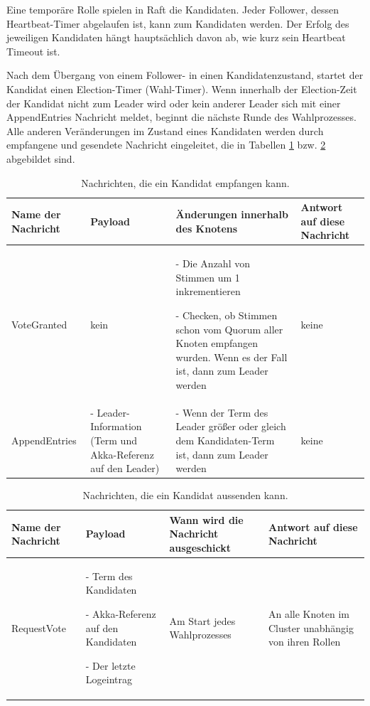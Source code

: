 Eine temporäre Rolle spielen in Raft die Kandidaten. Jeder Follower, dessen Heartbeat-Timer abgelaufen ist, kann zum Kandidaten werden. Der Erfolg des jeweiligen Kandidaten hängt hauptsächlich davon ab, wie kurz sein Heartbeat Timeout ist.

Nach dem Übergang von einem Follower- in einen Kandidatenzustand, startet der Kandidat einen Election-Timer (Wahl-Timer). Wenn innerhalb der Election-Zeit der Kandidat nicht zum Leader wird oder kein anderer Leader sich mit einer AppendEntries Nachricht meldet, beginnt die nächste Runde des Wahlprozesses. Alle anderen Veränderungen im Zustand eines Kandidaten werden durch empfangene und gesendete Nachricht eingeleitet, die in Tabellen \ref{tab:candidateReceive} bzw. \ref{tab:candidateSend} abgebildet sind.

\begin{table} \centering
	\begin{tabular}{|p{2.5cm}|p{3.5cm}|p{3.5cm}|p{3.5cm}|} 
		\hline
		\textbf{Name der Nachricht} & \textbf{Payload} & \textbf{Änderungen innerhalb des Knotens} & \textbf{Antwort auf diese Nachricht}\\
		
		\hline
		VoteGranted & kein & - Die Anzahl von Stimmen um 1 inkrementieren
		
		- Checken, ob Stimmen schon vom Quorum aller Knoten empfangen wurden. Wenn es der Fall ist, dann zum Leader werden
		 & keine\\
		
		\hline
		AppendEntries & - Leader-Information (Term und Akka-Referenz auf den Leader) 
		& - Wenn der Term des Leader größer oder gleich dem Kandidaten-Term ist, dann zum Leader werden & keine\\
		
		\hline
	\end{tabular}
	\caption{Nachrichten, die ein Kandidat empfangen kann.}
	\label{tab:candidateReceive}
\end{table}

\begin{table} \centering
	\begin{tabular}{|p{2.5cm}|p{3.5cm}|p{3.5cm}|p{3.5cm}|} 
		\hline
		\textbf{Name der Nachricht} & \textbf{Payload} & \textbf{Wann wird die Nachricht ausgeschickt} & \textbf{Antwort auf diese Nachricht}\\
		
		\hline
		RequestVote & - Term des Kandidaten
		
		- Akka-Referenz auf den Kandidaten
		
		- Der letzte Logeintrag
		 & Am Start jedes Wahlprozesses & An alle Knoten im Cluster unabhängig von ihren Rollen\\
		
		\hline
	\end{tabular}
	\caption{Nachrichten, die ein Kandidat aussenden kann.}
	\label{tab:candidateSend}
\end{table}

